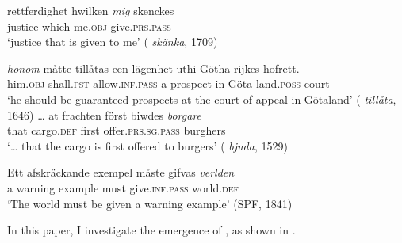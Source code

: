 \documentclass[output=paper]{langscibook}
\begin{document}
\ea%
    \label{ex:falk:2}

\ea\label{ex:falk:2a}
\gll rettferdighet    hwilken \textit{mig} skenckes\\
      justice      which  me.\textsc{obj}  give.\textsc{prs.pass}\\
\glt ‘justice that is given to me’ ( \textit{skänka}, 1709)

\ex\label{ex:falk:2b}
\gll      \textit{honom} måtte        tillåtas          een  lägenhet  uthi  Götha  rijkes      hofrett.\\
      him.\textsc{obj}  shall.\textsc{pst}    allow\textsc{.inf.pass}   a    prospect  in    Göta    land.\textsc{poss}  court\\
\glt     ‘he should be guaranteed prospects at the court of appeal in Götaland’ {(}{ \textit{tillåta}, 1646)}
\ex\label{ex:falk:2c}
\gll … at  frachten    först  biwdes \textit{borgare}\\
         {} that  cargo.\textsc{def}  first  offer{\textsc{.prs.sg.pass}}    burghers\\
\glt ‘… that the cargo is first offered to burgers’ ( \textit{bjuda}, 1529)

\ex\label{ex:falk:2d}
\gll Ett    afskräckande  exempel  måste    gifvas \textit{verlden}\\
      a      warning      example  must    give\textsc{.inf.pass}  world\textsc{.def}\\
\glt `The world must be given a warning example’ (SPF, 1841)
    \z
    \z

\noindent In this paper, I investigate the emergence of , as shown in .
\end{document}
